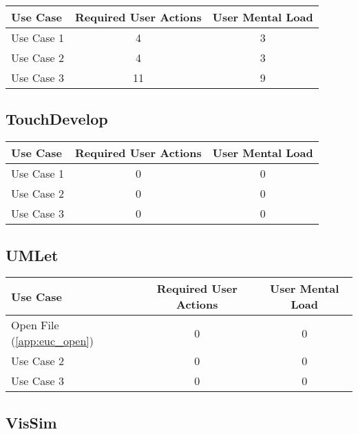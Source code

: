\begin{tabularx}{\textwidth}{Xcc}
\textbf{Use Case} & \textbf{Required User Actions} & \textbf{User Mental Load}\\
\hline
Use Case 1                          & 4 & 3 \\
Use Case 2                          & 4 & 3 \\
Use Case 3                          & 11 & 9
\end{tabularx}

\subsection*{TouchDevelop}




\begin{tabularx}{\textwidth}{Xcc}
\textbf{Use Case} & \textbf{Required User Actions} & \textbf{User Mental Load}\\
\hline
Use Case 1                          & 0 & 0 \\
Use Case 2                          & 0 & 0 \\
Use Case 3                          & 0 & 0
\end{tabularx}

\subsection*{UMLet}

\begin{tabularx}{\textwidth}{Xcc}
\textbf{Use Case} & \textbf{Required User Actions} & \textbf{User Mental Load}\\
\hline
Open File (\ref{app:euc_open}) & 0 & 0 \\
Use Case 2                     & 0 & 0 \\
Use Case 3                     & 0 & 0
\end{tabularx}

\subsection*{VisSim}

